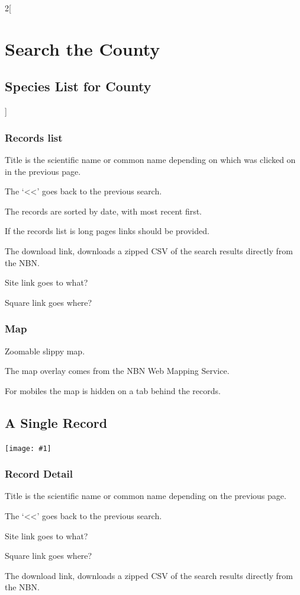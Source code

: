 \documentclass[a4paper,12pt,landscape]{article}
\newcommand{\wireframe}[1]{\texttt{[image: \#1]}\clearpage}
\begin{document}
\begin{multicols*}{2}[%
  \section{Search the County}%
  \subsection{Species List for County}%
]
\subsubsection*{Records list} 

\begin{todolist}
  \item Title is the scientific name or common name depending on which was clicked on in the previous page.
  \item The `<<' goes back to the previous search.
  \item The records are sorted by date, with most recent first.
  \item If the records list is long pages links should be provided.
  \item The download link, downloads a zipped CSV of the search results directly from the NBN.
  \item Site link goes to what? %
  \item Square link goes where? %
\end{todolist}

\subsubsection*{Map} 

\begin{todolist}
  \item Zoomable slippy map.
  \item The map overlay comes from the NBN Web Mapping Service.
  \item For mobiles the map is hidden on a tab behind the records.
\end{todolist}

\clearpage
\subsection{A Single Record}

\wireframe{./wireframes/Records__SingleRecord.png}%

\subsubsection*{Record Detail} 

\begin{todolist}
  \item Title is the scientific name or common name depending on the previous page.
  \item The `<<' goes back to the previous search.
  \item Site link goes to what? %
  \item Square link goes where? %
  \item The download link, downloads a zipped CSV of the search results directly from the NBN.
\end{todolist}


\end{multicols*}
\end{document}
